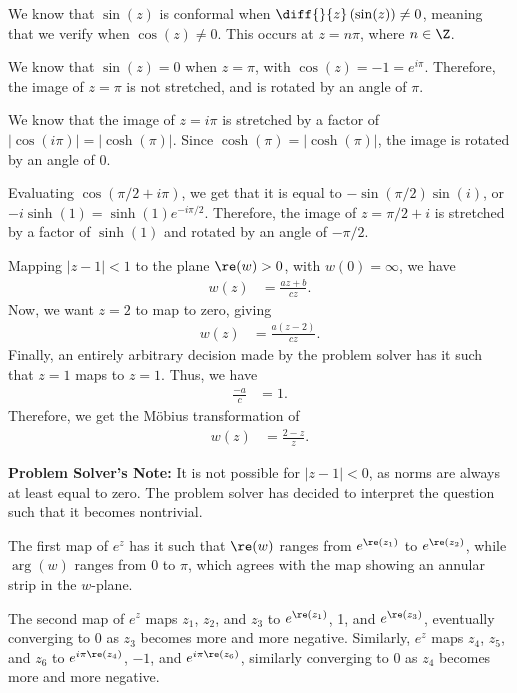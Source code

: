 \documentclass[10pt]{mypackage}
\begin{document}
\RaggedRight
\begin{solution}[20.1]
  We know that $\sin(z)$ is conformal when $\diff{}{z}\left( \sin(z) \right) \neq 0$, meaning that we verify when $\cos(z) \neq 0$. This occurs at $z = n\pi$, where $n\in \Z$.\newline

  We know that $\sin(z) = 0$ when $z = \pi$, with $\cos(z) = -1 = e^{i\pi}$. Therefore, the image of $z = \pi$ is not stretched, and is rotated by an angle of $\pi$.\newline

  We know that the image of $z = i\pi$ is stretched by a factor of $\left\vert \cos\left( i\pi \right) \right\vert = \left\vert \cosh\left( \pi \right) \right\vert$. Since $\cosh\left( \pi \right) = \left\vert \cosh\left( \pi \right) \right\vert$, the image is rotated by an angle of $0$.\newline

  Evaluating $\cos\left( \pi/2 + i\pi\right)$, we get that it is equal to $-\sin\left( \pi/2 \right)\sin\left( i \right)$, or $-i\sinh(1) = \sinh(1)e^{-i\pi/2}$. Therefore, the image of $z = \pi/2 + i$ is stretched by a factor of $\sinh(1)$ and rotated by an angle of $-\pi/2$.
\end{solution}
\begin{solution}[20.9]
  Mapping $\left\vert z-1 \right\vert < 1$ to the plane $\re(w) > 0$, with $w(0) = \infty$, we have
  \begin{align*}
    w(z) &= \frac{az + b}{cz}.
  \end{align*}
  Now, we want $z = 2$ to map to zero, giving
  \begin{align*}
    w(z) &= \frac{a\left( z-2 \right)}{cz}.
  \end{align*}
  Finally, an entirely arbitrary decision made by the problem solver has it such that $z = 1$ maps to $z = 1$. Thus, we have
  \begin{align*}
    \frac{-a}{c} &= 1.
  \end{align*}
  Therefore, we get the Möbius transformation of
  \begin{align*}
    w(z) &= \frac{2-z}{z}.
  \end{align*}
\end{solution}
{\tiny \textbf{Problem Solver's Note:} It is not possible for $\left\vert z-1 \right\vert < 0$, as norms are always at least equal to zero. The problem solver has decided to interpret the question such that it becomes nontrivial.}
\begin{solution}[20.10]
  The first map of $e^z$ has it such that $\re(w)$ ranges from $e^{\re\left(z_1\right)}$ to $e^{\re\left( z_2 \right)}$, while $\arg(w)$ ranges from $0$ to $\pi$, which agrees with the map showing an annular strip in the $w$-plane.\newline

  The second map of $e^{z}$ maps $z_1$, $z_2$, and $z_3$ to $e^{\re\left( z_1 \right)}$, 1, and $e^{\re\left( z_3 \right)}$, eventually converging to $0$ as $z_3$ becomes more and more negative. Similarly, $e^{z}$ maps $z_4$, $z_5$, and $z_6$ to $e^{i\pi\re\left( z_4 \right)}$, $-1$, and $e^{i\pi\re\left( z_6 \right)}$, similarly converging to $0$ as $z_4$ becomes more and more negative.
\end{solution}
\end{document}
